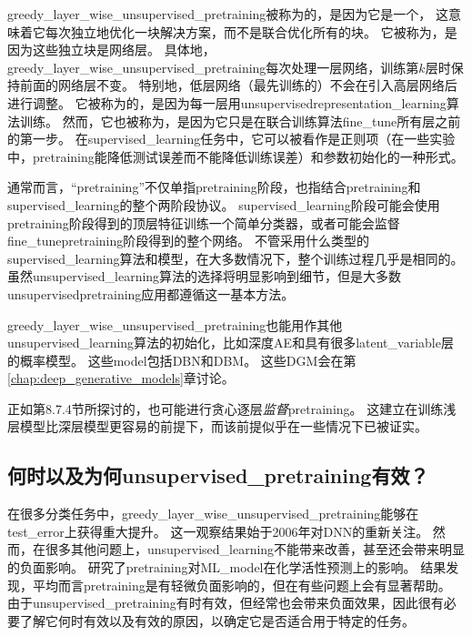 \gls{greedy_layer_wise_unsupervised_pretraining}被称为的，是因为它是一个，
这意味着它每次独立地优化一块解决方案，而不是联合优化所有的块。
它被称为，是因为这些独立块是网络层。
具体地，\gls{greedy_layer_wise_unsupervised_pretraining}每次处理一层网络，训练第$k$层时保持前面的网络层不变。
特别地，低层网络（最先训练的）不会在引入高层网络后进行调整。
它被称为的，是因为每一层用\gls{unsupervised}\gls{representation_learning}算法训练。
然而，它也被称为，是因为它只是在联合训练算法\gls{fine_tune}所有层之前的第一步。
在\gls{supervised_learning}任务中，它可以被看作是正则项（在一些实验中，\gls{pretraining}能降低测试误差而不能降低训练误差）和参数初始化的一种形式。


通常而言，“\gls{pretraining}”不仅单指\gls{pretraining}阶段，也指结合\gls{pretraining}和\gls{supervised_learning}的整个两阶段协议。
\gls{supervised_learning}阶段可能会使用\gls{pretraining}阶段得到的顶层特征训练一个简单分类器，或者可能会监督\gls{fine_tune}\gls{pretraining}阶段得到的整个网络。
不管采用什么类型的\gls{supervised_learning}算法和模型，在大多数情况下，整个训练过程几乎是相同的。
虽然\gls{unsupervised_learning}算法的选择将明显影响到细节，但是大多数\gls{unsupervised}\gls{pretraining}应用都遵循这一基本方法。


\gls{greedy_layer_wise_unsupervised_pretraining}也能用作其他\gls{unsupervised_learning}算法的初始化，比如深度\gls{AE}\citep{Hinton-Science2006}和具有很多\gls{latent_variable}层的概率模型。
这些\gls{model}包括\gls{DBN}\citep{Hinton06-small}和\gls{DBM}\citep{Salakhutdinov+Hinton-2009-small}。
这些\gls{DGM}会在第\ref{chap:deep_generative_models}章讨论。


正如第8.7.4节所探讨的，也可能进行贪心逐层\emph{监督}\gls{pretraining}。
这建立在训练浅层模型比深层模型更容易的前提下，而该前提似乎在一些情况下已被证实\citep{Erhan+al-2010-small}。


\subsection{何时以及为何\gls{unsupervised_pretraining}有效？}
\label{subsec:when_and_why_does_unsupervised_pretraining_work}
在很多分类任务中，\gls{greedy_layer_wise_unsupervised_pretraining}能够在\gls{test_error}上获得重大提升。
这一观察结果始于2006年对\gls{DNN}的重新关注\citep{Hinton06-small,Bengio-nips-2006,ranzato-07-small}。
然而，在很多其他问题上，\gls{unsupervised_learning}不能带来改善，甚至还会带来明显的负面影响。
\cite{Ma-et-al-2015}研究了\gls{pretraining}对\gls{ML_model}在化学活性预测上的影响。
结果发现，平均而言\gls{pretraining}是有轻微负面影响的，但在有些问题上会有显著帮助。
由于\gls{unsupervised_pretraining}有时有效，但经常也会带来负面效果，因此很有必要了解它何时有效以及有效的原因，以确定它是否适合用于特定的任务。

